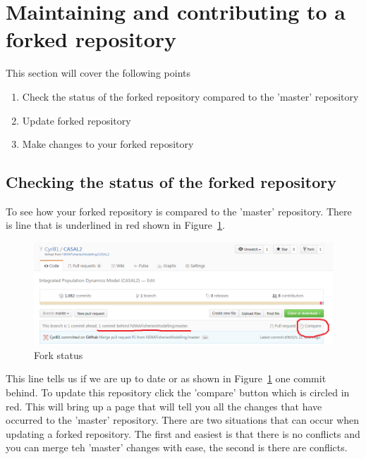 \section{Maintaining and contributing to a forked repository\label{sec:maintain_repo}}
This section will cover the following points
\begin{enumerate}
	\item Check the status of the forked repository compared to the 'master' repository
	\item Update forked repository
	\item Make changes to your forked repository
\end{enumerate}

\subsection{Checking the status of the forked repository}

To see how your forked repository is compared to the 'master' repository. There is line that is underlined in red shown in Figure~\ref{fig:fork_status}.
	
\begin{figure}[!ht]
	\includegraphics[scale=0.6]{Figures/fork_status.png}
	\caption{Fork status}\label{fig:fork_status}
\end{figure}

This line tells us if we are up to date or as shown in Figure~\ref{fig:fork_status} one commit behind. To update this repository click the 'compare' button which is circled in red. This will bring up a page that will tell you all the changes that have occurred to the 'master' repository. There are two situations that can occur when updating a forked repository. The first and easiest is that there is no conflicts and you can merge teh 'master' changes with ease, the second is there are conflicts.